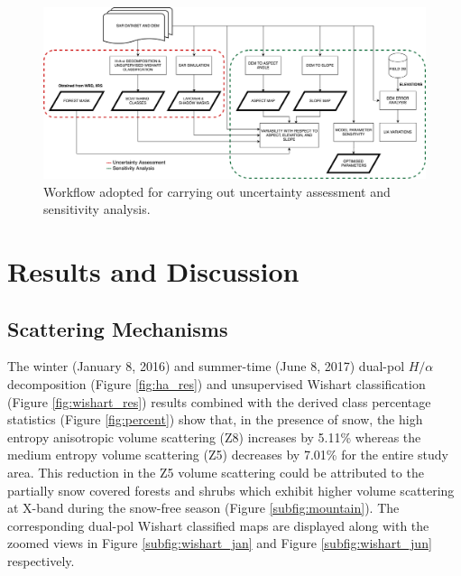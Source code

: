 \documentclass[review]{elsarticle}
\numberwithin{equation}{section}
\numberwithin{figure}{section}
\numberwithin{table}{section}
\begin{document}
\begin{figure}[htb]
    \centering
    \includegraphics[width=\textwidth]{Figures/Methods/Uncertainty.png}
    \caption{Workflow adopted for carrying out uncertainty assessment and sensitivity analysis.}
    \label{fig:ua}
\end{figure}

\section{Results and Discussion}
\label{sec:res}
\subsection{Scattering Mechanisms}
\label{ssec:scat}

The winter (January 8, 2016) and summer-time (June 8, 2017) dual-pol $H/{\alpha}$ decomposition (Figure \ref{fig:ha_res}) and unsupervised Wishart classification (Figure \ref{fig:wishart_res}) results combined with the derived class percentage statistics (Figure \ref{fig:percent}) show that, in the presence of snow, the high entropy anisotropic volume scattering (Z8) increases by 5.11\% whereas the medium entropy volume scattering (Z5) decreases by 7.01\% for the entire study area. This reduction in the Z5 volume scattering could be attributed to the partially snow covered forests and shrubs which exhibit higher volume scattering at X-band during the snow-free season (Figure \ref{subfig:mountain}). The corresponding dual-pol Wishart classified maps are displayed along with the zoomed views in Figure \ref{subfig:wishart_jan} and Figure \ref{subfig:wishart_jun} respectively.
\end{document}
